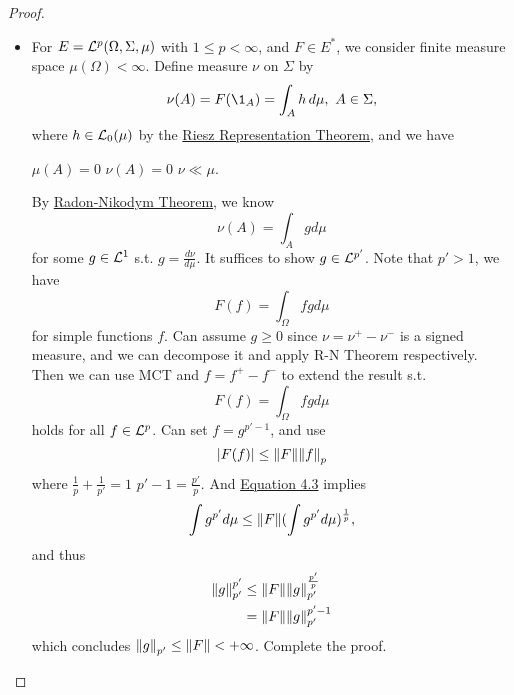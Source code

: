 \begin{proof}
\begin{itemize}
\begin{proof}[Summary]
    If $1 < p \leq \infty$, then $\sup_{\norm{f}_p = 1} \abs{F(f)}$ is attained.\\ 
    For $p = 1$, the supremum is not attained.
    \end{proof}
    \item For $E = \mathcal{L}^p(\Omega,\Sigma,\mu)$ with $1 \leq p < \infty$, and $F \in E^*$, we consider finite measure space $\mu(\Omega) < \infty$. Define measure $\nu$ on $\Sigma$ by
    \begin{equation*}
        \nu(A) = F(\1_A) = \int_A h \dr \mu,\ A \in \Sigma,
    \end{equation*}
    where $h \in \mathcal{L}_0(\mu)$ by the \hyperref[RRT]{Riesz Representation Theorem}, and we have
    \begin{center}
        $\mu(A) = 0$ \imply $\nu(A) = 0$ \imply $\nu \ll \mu$.
    \end{center}
    By \hyperref[R-N thm]{Radon-Nikodym Theorem}, we know
    \begin{equation*}
        \nu(A) = \int_A g d\mu
    \end{equation*}
    for some $g \in \mathcal{L}^1$ s.t. $g = \frac{d\nu}{d\mu}$. It suffices to show $g \in \mathcal{L}^{p'}$. Note that $p' > 1$, we have
    \begin{equation*}
        F(f) = \int_{\Omega} fg d\mu
    \end{equation*}
    for simple functions $f$. Can assume $g \geq 0$ since $\nu = \nu^+ - \nu^-$ is a signed measure, and we can decompose it and apply R-N Theorem respectively. Then we can use MCT and $f = f^+ - f^-$ to extend the result s.t.
    \begin{equation*}
            F(f) = \int_{\Omega} fg d\mu
    \end{equation*}
    holds for all $f \in \mathcal{L}^p$. Can set $f = g^{p' - 1}$, and use 
    \begin{equation}
        \abs{F(f)} \leq \norm{F} \norm{f}_p\label{eq:4.3}
    \end{equation}
    where $\frac{1}{p} + \frac{1}{p'} = 1$ \imply $p' - 1 = \frac{p'}{p}$. And \hyperref[eq:4.3]{Equation 4.3} implies
    \begin{equation*}
        \int g^{p'} d\mu \leq \norm{F} (\int g^{p'} d\mu)^{\frac{1}{p}},
    \end{equation*}
    and thus
    \begin{align*}
        \norm{g}_{p'}^{p'} &\leq \norm{F} \norm{g}_{p'}^{\frac{p'}{p}}\\
        &= \norm{F} \norm{g}_{p'}^{p' - 1}
    \end{align*}
    which concludes $\norm{g}_{p'} \leq \norm{F} < +\infty$. Complete the proof.
\end{itemize}
\end{proof}

